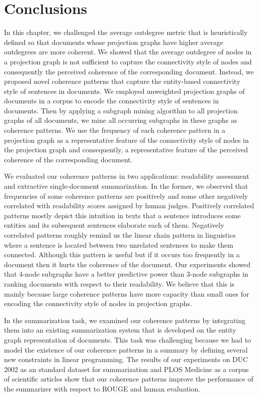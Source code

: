 \section{Conclusions}
\label{sec:conclusions}
In this chapter, we challenged the average outdegree metric that is heuristically defined so that documents whose projection graphs have higher average outdegrees are more coherent. 
We showed that the average outdegree of nodes in a projection graph is not sufficient to capture the connectivity style of nodes and consequently the perceived coherence of the corresponding document. 
Instead, we proposed novel coherence patterns that capture the entity-based connectivity style of sentences in documents. 
We employed unweighted projection graphs of documents in a corpus to encode the connectivity style of sentences in documents.  
Then by applying a subgraph mining algorithm to all projection graphs of all documents, we mine all occurring subgraphs in these graphs as coherence patterns. 
We use the frequency of each coherence pattern in a projection graph as a representative feature of the connectivity style of nodes in the projection graph and consequently, a representative feature of the perceived coherence of the corresponding document. 

We evaluated our coherence patterns in two applications: readability assessment and extractive \mbox{single-document} summarization. 
In the former, we observed that frequencies of some coherence patterns are positively and some other negatively correlated with readability scores assigned by human judges. 
Positively correlated patterns mostly depict this intuition in texts that a sentence introduces some entities and its subsequent sentences elaborate each of them.  
Negatively correlated patterns roughly remind us the linear chain pattern in linguistics where a sentence is located between two unrelated sentences to make them connected. 
Although this pattern is useful but if it occurs too frequently in a document then it hurts the coherence of the document. 
Our experiments showed that 4-node subgraphs have a better predictive power than  3-node subgraphs in ranking documents with respect to their readability. 
We believe that this is mainly because large coherence patterns have more capacity than small ones for encoding the connectivity style of nodes in projection graphs. 

In the summarization task, we examined our coherence patterns by integrating them into an existing summarization system that is developed on the entity graph representation of documents. 
This task was challenging  because we had to model the existence of our coherence patterns in a summary by defining several new constraints in linear programming.  
The results of our experiments on DUC 2002 as an standard dataset for summarization and PLOS Medicine as a corpus of scientific articles show that our coherence patterns improve the performance of the summarizer with respect to ROUGE and human evaluation. 


